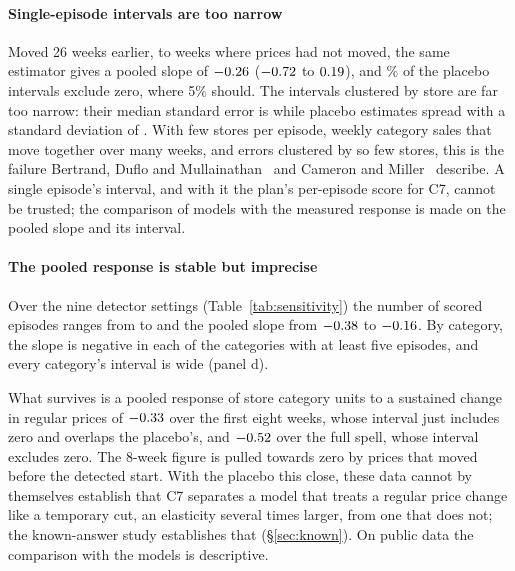 \paragraph{Single-episode intervals are too narrow}
Moved 26 weeks earlier, to weeks where prices had not moved, the same estimator
gives a pooled slope of $-0.26$ ($-0.72$ to $0.19$), and
\zPlaceboSig\% of the \zPlaceboN{} placebo intervals exclude zero, where 5\%
should. The intervals clustered by store are far too narrow: their median
standard error is \zEpisodeSE{} while placebo estimates spread with a standard
deviation of \zPlaceboSD. With few stores per episode, weekly category sales that
move together over many weeks, and errors clustered by so few
stores, this is the failure Bertrand, Duflo and Mullainathan~\cite{bertrand2004}
and Cameron and Miller~\cite{cameron2015} describe. A single episode's
interval, and with it the plan's per-episode score for C7, cannot be trusted;
the comparison of models with the measured response is made on the pooled
slope and its interval.

\paragraph{The pooled response is stable but imprecise}
Over the nine detector settings (Table~\ref{tab:sensitivity}) the number of
scored episodes ranges from \zSensLo{} to \zSensHi{} and the pooled slope from
$-0.38$ to $-0.16$. By category, the slope is negative in
each of the \zCatN{} categories with at least five episodes, and every
category's interval is wide (panel d).

\begin{table}[t]
\centering
\caption{\textbf{The pooled response keeps its sign under every detector
setting.} Episodes found and scored, and the pooled 8-week slope, for each
weekly size and episode median; the plan's setting in bold. The settings and
the pooled slope were fixed in advance.}
\label{tab:sensitivity}
\footnotesize

\end{table}

What survives is a pooled response of store category units to a sustained
change in regular prices of $-0.33$ over the first eight weeks, whose interval
just includes zero and overlaps the placebo's, and $-0.52$ over the full
spell, whose interval excludes zero. The 8-week figure is pulled towards zero by
prices that moved before the detected start. With the placebo this close, these data cannot by themselves establish
that C7 separates a model that treats a regular price change like a temporary
cut, an elasticity several times larger, from one that does not; the
known-answer study establishes that (\S\ref{sec:known}). On public data the
comparison with the models is descriptive.

